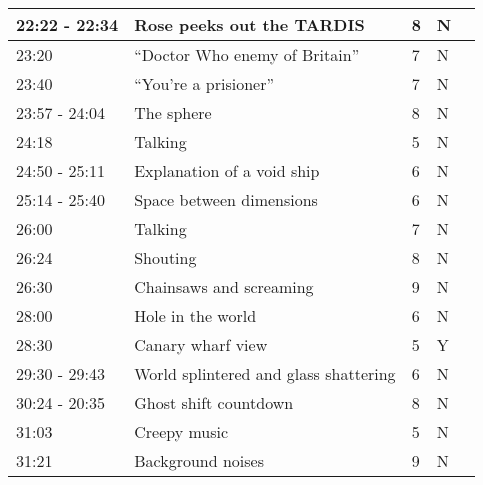 \begin{longtable}{| p{70pt} | p{130pt} | p{45pt} | p{57pt} | p{60pt}|}
22:22 - 22:34           &           Rose peeks out the TARDIS           &           8           &           N          &           \\\hline
23:20           &           ``Doctor Who enemy of Britain''           &           7           &           N          &           \\\hline
23:40           &           ``You're a prisioner''           &           7           &           N          &           \\\hline
23:57 - 24:04           &           The sphere           &           8           &           N          &           \\\hline
24:18           &           Talking           &           5           &           N          &           \\\hline
24:50 - 25:11           &           Explanation of a void ship           &           6           &           N          &           \\\hline
25:14 - 25:40           &           Space between dimensions           &           6           &           N          &           \\\hline
26:00           &           Talking           &           7           &           N          &           \\\hline
26:24           &           Shouting           &           8           &           N          &           \\\hline
26:30           &           Chainsaws and screaming           &           9           &           N          &           \\\hline
28:00           &           Hole in the world           &           6           &           N          &           \\\hline
28:30           &           Canary wharf view           &           5           &           Y          &           \\\hline
29:30 - 29:43           &           World splintered and glass shattering           &           6           &           N          &           \\\hline
30:24 - 20:35           &           Ghost shift countdown           &           8           &           N          &           \\\hline
31:03           &           Creepy music           &           5           &           N          &           \\\hline
31:21           &           Background noises           &           9           &           N          &           \\\hline

\end{longtable}
